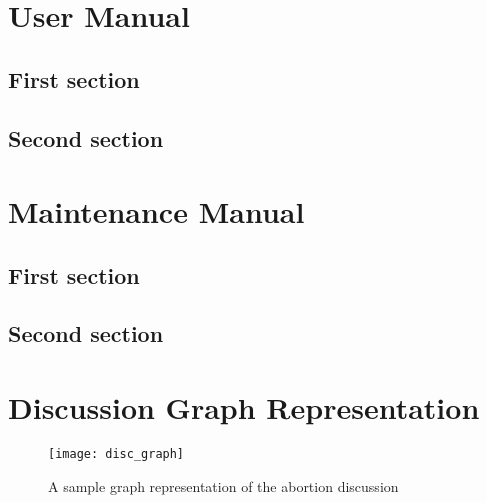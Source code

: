\begin{appendices}
    \makeatletter
    \makeatother

    \chapter{User Manual}
      \section{First section}
      \section{Second section}

    \chapter{Maintenance Manual}
      \section{First section}
      \section{Second section}

    \chapter{Discussion Graph Representation\label{app:disc_graph}}
      \begin{figure}[h]
        \caption{A sample graph representation of the abortion discussion}
        \centering
        \texttt{[image: disc\_graph]}
      \end{figure}
\end{appendices}
